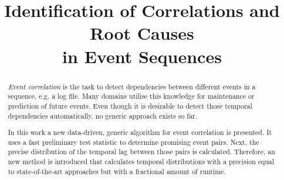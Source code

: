 \documentclass[conference]{IEEEtran}
\theoremstyle{examplestyle}
\begin{document}
\begin{acronym}
\end{acronym}





\title{Identification of Correlations and Root Causes \\ in Event Sequences}


\author{
\and
{}
\and
{}
}



\maketitle


\begin{abstract}

\textit{Event correlation} is the task to detect dependencies between different events in a sequence, e.g. a log file. Many domains utilise this knowledge for maintenance or prediction of future events. Even though it is desirable to detect those temporal dependencies automatically, no generic approach exists so far.

In this work a new data-driven, generic algorithm for event correlation is presented. It uses a fast preliminary test statistic to determine promising event pairs. Next, the precise distribution of the temporal lag between those pairs is calculated. Therefore, an new method is introduced that calculates temporal distributions with a precision equal to state-of-the-art approaches but with a fractional amount of runtime.

\end{abstract}
\end{document}

